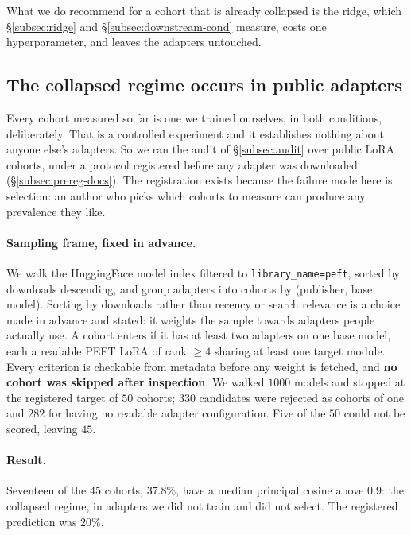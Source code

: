 What we do recommend for a cohort that is already collapsed is the ridge, which
\S\ref{subsec:ridge} and \S\ref{subsec:downstream-cond} measure, costs one
hyperparameter, and leaves the adapters untouched.

\subsection{The collapsed regime occurs in public adapters}
\label{subsec:prevalence}

Every cohort measured so far is one we trained ourselves, in both conditions,
deliberately. That is a controlled experiment and it establishes nothing about
anyone else's adapters. So we ran the audit of \S\ref{subsec:audit} over public
LoRA cohorts, under a protocol registered before any adapter was downloaded
(\S\ref{subsec:prereg-docs}). The registration exists because the failure mode
here is selection: an author who picks which cohorts to measure can produce any
prevalence they like.

\paragraph{Sampling frame, fixed in advance.} We walk the HuggingFace model
index filtered to \texttt{library\_name=peft}, sorted by downloads descending,
and group adapters into cohorts by (publisher, base model). Sorting by
downloads rather than recency or search relevance is a choice made in advance
and stated: it weights the sample towards adapters people actually use. A
cohort enters if it has at least two adapters on one base model, each a
readable PEFT LoRA of rank $\geq 4$ sharing at least one target module. Every
criterion is checkable from metadata before any weight is fetched, and
\textbf{no cohort was skipped after inspection}. We walked $1000$ models and
stopped at the registered target of $50$ cohorts; $330$ candidates were
rejected as cohorts of one and $282$ for having no readable adapter
configuration. Five of the $50$ could not be scored, leaving $45$.

\paragraph{Result.} Seventeen of the $45$ cohorts, \textbf{$37.8\%$}, have a
median principal cosine above $0.9$: the collapsed regime, in adapters we did
not train and did not select. The registered prediction was $20\%$.

